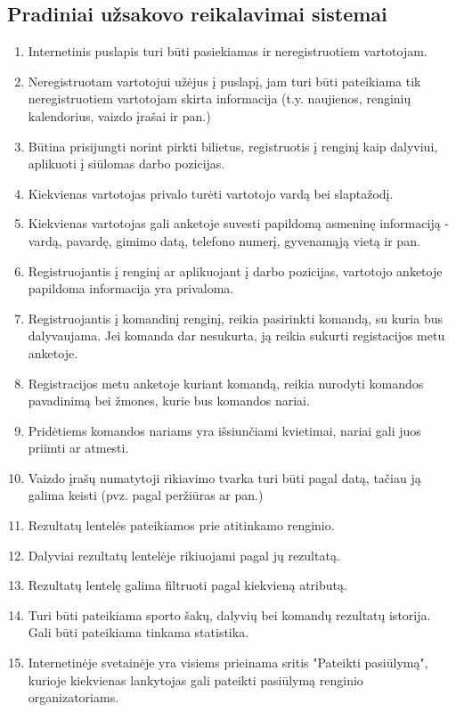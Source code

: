 \documentclass{VUMIFPSkursinis}
\begin{document}
        \subsection{Pradiniai užsakovo reikalavimai sistemai}
		\begin{enumerate}
			\item Internetinis puslapis turi būti pasiekiamas ir neregistruotiem vartotojam.
			\item Neregistruotam vartotojui užėjus į puslapį, jam turi būti pateikiama tik neregistruotiem vartotojam skirta informacija (t.y. naujienos, renginių kalendorius, vaizdo įrašai ir pan.)
			\item Būtina prisijungti norint pirkti bilietus, registruotis į renginį kaip dalyviui, aplikuoti į siūlomas darbo pozicijas.
			\item Kiekvienas vartotojas privalo turėti vartotojo vardą bei slaptažodį.
			\item Kiekvienas vartotojas gali anketoje suvesti papildomą asmeninę informaciją - vardą, pavardę, gimimo datą, telefono numerį, gyvenamąją vietą ir pan.
			\item Registruojantis į renginį ar aplikuojant į darbo pozicijas, vartotojo anketoje papildoma informacija yra privaloma.
			\item Registruojantis į komandinį renginį, reikia pasirinkti komandą, su kuria bus dalyvaujama. Jei komanda dar nesukurta, ją reikia sukurti registacijos metu anketoje.
			\item Registracijos metu anketoje kuriant komandą, reikia nurodyti komandos pavadinimą bei žmones, kurie bus komandos nariai.
			\item Pridėtiems komandos nariams yra išsiunčiami kvietimai, nariai gali juos priimti ar atmesti.
			\item Vaizdo įrašų numatytoji rikiavimo tvarka turi būti pagal datą, tačiau ją galima keisti (pvz. pagal peržiūras ar pan.)
			\item Rezultatų lentelės pateikiamos prie atitinkamo renginio.
			\item Dalyviai rezultatų lentelėje rikiuojami pagal jų rezultatą.
			\item Rezultatų lentelę galima filtruoti pagal kiekvieną atributą.
			\item Turi būti pateikiama sporto šakų, dalyvių bei komandų rezultatų istorija. Gali būti pateikiama tinkama statistika.
			\item Internetinėje svetainėje yra visiems prieinama sritis "Pateikti pasiūlymą", kurioje kiekvienas lankytojas gali pateikti pasiūlymą renginio organizatoriams.

\end{enumerate}
\end{document}
